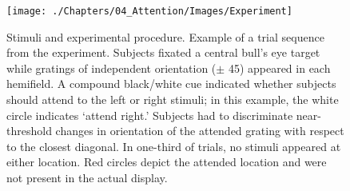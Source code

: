\begin{figure}[!ht]
\centering
\texttt{[image: ./Chapters/04\_Attention/Images/Experiment]}
\caption{Stimuli and experimental procedure. Example of a trial sequence from the experiment. Subjects fixated a central bull's eye target while gratings of independent orientation ($\pm$ 45\textdegree) appeared in each hemifield. A compound black/white cue indicated whether subjects should attend to the left or right stimuli; in this example, the white circle indicates `attend right.' Subjects had to discriminate near-threshold changes in orientation of the attended grating with respect to the closest diagonal. In one-third of trials, no stimuli appeared at either location. Red circles depict the attended location and were not present in the actual display.}
\label{fig:experiment}
\end{figure}